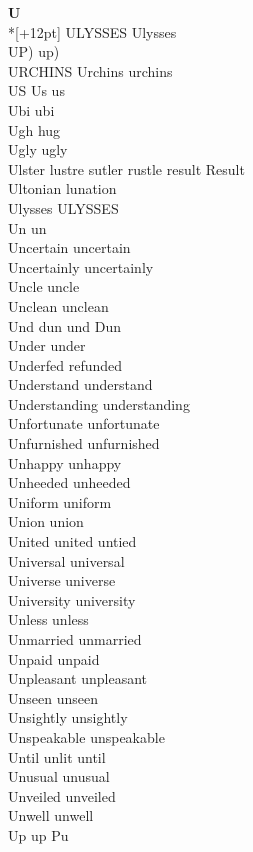 \vspace{14pt}
\noindent\textbf{\Large U}\\*[+12pt]
ULYSSES Ulysses\\
UP) up)\\
URCHINS Urchins urchins\\
US Us us\\
Ubi ubi\\
Ugh hug\\
Ugly ugly\\
Ulster lustre sutler rustle result Result\\
Ultonian lunation\\
Ulysses ULYSSES\\
Un un\\
Uncertain uncertain\\
Uncertainly uncertainly\\
Uncle uncle\\
Unclean unclean\\
Und dun und Dun\\
Under under\\
Underfed refunded\\
Understand understand\\
Understanding understanding\\
Unfortunate unfortunate\\
Unfurnished unfurnished\\
Unhappy unhappy\\
Unheeded unheeded\\
Uniform uniform\\
Union union\\
United united untied\\
Universal universal\\
Universe universe\\
University university\\
Unless unless\\
Unmarried unmarried\\
Unpaid unpaid\\
Unpleasant unpleasant\\
Unseen unseen\\
Unsightly unsightly\\
Unspeakable unspeakable\\
Until unlit until\\
Unusual unusual\\
Unveiled unveiled\\
Unwell unwell\\
Up up Pu\\
